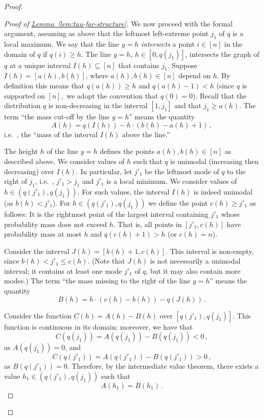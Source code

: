 \documentclass[10pt]{article}
\theoremstyle{definition}
\providecommand{\ie}{i.e.\ }
\numberwithin{equation}{section}
\newcommand{\expref}[2]{\texorpdfstring{\hyperref[#2]{#1~\ref{#2}}}{#1~\ref{#2}}}
\begin{document}
\begin{proof}
\begin{proof}[Proof of \expref{Lemma}{lem:tau-far-structure}]
We now proceed with the formal argument, assuming as above that
the leftmost left-extreme point $j_{{1}}$ of $q$ is a local maximum.
We say that the line $y=h$ \emph{intersects} a point $i \in [n]$ in the domain of $q$ if
$q(i) \geq h$.  The line $y = h$, $h \in [0,q(j_{{1}})]$, intersects the graph of $q$ at a unique interval $I(h) \subseteq [n]$ that contains $j_{{1}}$.
%
Suppose $I(h) = [a(h),b(h)]$, where $a(h),b(h) \in [n]$ depend on $h$.
By definition this means that $q(a(h)) \geq h$ and $q(a(h)-1) < h$
{(since $q$ is supported on $[n],$ 
we adopt the convention that $q(0)=0$).}
Recall that the distribution $q$ is non-decreasing
in the interval $[1,j_{{1}}]$ and that $j_{{1}} \geq a(h)$.
The term ``the mass cut-off by the line $y=h$'' means
the quantity $$A(h) = q\left( I(h) \right) - h \cdot (b(h)-a(h)+1)\,,$$
\ie, the ``mass of the interval $I(h)$ above the line.''

The height $h$ of the line $y=h$ defines the points $a(h), b(h)\in [n]$ as described above.
We consider values of $h$ such that $q$ is unimodal (increasing then decreasing) over $I(h)$.
In particular, let $j'_{{1}}$ be the leftmost mode of $q$ to the right of $j_{{1}}$,
\ie, $j'_{{1}}>j_{{1}}$ and $j'_{{1}}$ is a local minimum.
We consider values of $h \in (q(j'_{{1}}), q(j_{{1}}))$. For such values, the
interval $I(h)$ is indeed unimodal (as $b(h) < j'_{{1}}$).
For  $h \in (q(j'_{{1}}), q(j_{{1}}))$ we define the point $c(h) \geq j'_{{1}}$ as follows:
It is the rightmost point of the largest interval containing
$j'_{{1}}$ whose probability mass does not exceed $h$. That is, all points
in $[j'_{{1}}, c(h)]$ have probability mass at most $h$ and $q(c(h)+1) > h$
(or $c(h)=n$).

Consider the interval $J(h) = [b(h)+1, c(h)]$.
This interval is non-empty, since $b(h)< j'_{{1}} \leq c(h)$.
(Note that $J(h)$ is not necessarily a unimodal interval; it contains at
least one mode $j'_{{1}}$ {of $q$}, but it may also contain more modes.)
The term ``the mass missing to the right of the line $y=h$''
means the quantity $$B(h) = h \cdot (c(h)-b(h)) - q\left(J(h)\right)\,.$$

Consider the function $C(h) = A(h) - B(h)$ over $[q(j'_{{1}}), q(j_{{1}})]$.
This function is continuous in its domain; moreover, we have that
$$C\left(q(j_{{1}})\right) = A\left(q(j_{{1}})\right) - B\left(q(j_{{1}})\right) <0\,,$$
as $A\left(q(j_{{1}})\right)=0$,
and $$C\left(q(j'_{{1}})\right) = A\left(q(j'_{{1}})\right) - B\left(q(j'_{{1}})\right) > 0\,,$$
as $B\left(q(j'_{{1}})\right)=0$. Therefore, by the intermediate value theorem,
there exists a value $h_{{1}} \in (q(j'_{{1}}), q(j_{{1}}))$ such that $$A(h_{{1}}) = B(h_{{1}})\,.$$


\end{proof}
\end{proof}
\end{document}

